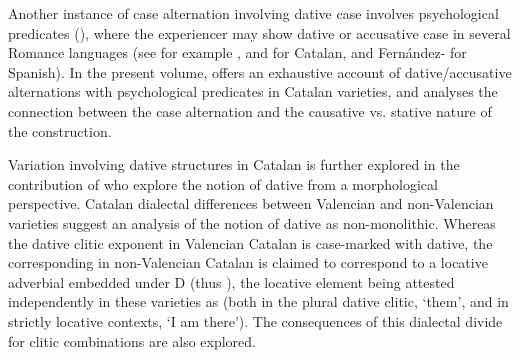 \begin{styleNormalWeb}
Another instance of case alternation involving dative case involves psychological predicates (), where the experiencer may show dative or accusative case in several Romance languages (see for example \citet{MateuCabré2002}, \citet{PinedaRoyo2017} and \citet{Royo2017} for Catalan, and Fernández-\citet{Ordóñez1999} for Spanish). In the present volume, offers an exhaustive account of dative/accusative alternations with psychological predicates in Catalan varieties, and analyses the connection between the case alternation and the causative vs. stative nature of the construction.
\end{styleNormalWeb}

\begin{styleListNumberi}
Variation involving dative structures in Catalan is further explored in  the contribution of who explore the notion of dative from a morphological perspective. Catalan dialectal differences between Valencian and non-Valencian varieties suggest an analysis of the notion of dative as non-monolithic. Whereas the dative clitic exponent in Valencian Catalan is case-marked with dative, the corresponding in non-Valencian Catalan is claimed to correspond to a locative adverbial embedded under D (thus ), the locative element being attested independently in these varieties as (both in the plural dative clitic,  ‘them’, and in strictly locative contexts, ‘I am there’). The consequences of this dialectal divide for clitic combinations are also explored.
\end{styleListNumberi}

